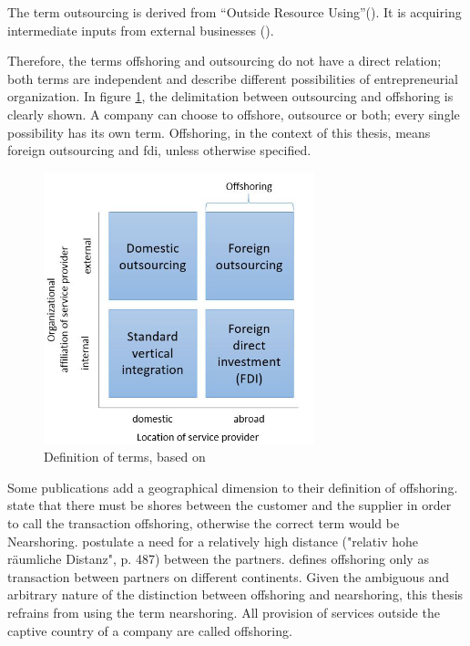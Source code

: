 The term outsourcing is derived from ``Outside Resource Using''(\cite[p. 46]{Specht.2007b}). It is acquiring intermediate inputs from external businesses (\cite[p. 46]{Specht.2007b}).

Therefore, the terms offshoring and outsourcing do not have a direct relation; both terms are independent and describe different possibilities of entrepreneurial organization. In figure \ref{fig:DefTerms}, the delimitation between outsourcing and offshoring is clearly shown. A company can choose to offshore, outsource or both; every single possibility has its own term. Offshoring, in the context of this thesis, means foreign outsourcing and \gls{fdi}, unless otherwise specified.

\begin{figure}[htb]
	\centering
	\includegraphics[width=0.7\textwidth]{Pictures/Terms_definition}
	\caption{Definition of terms, based on \cite[pp. 552f]{Antras.2004}}
	\label{fig:DefTerms}
\end{figure}

Some publications add a geographical dimension to their definition of offshoring. \cite{Jahns.2007} state that there must be shores between the customer and the supplier in order to call the transaction offshoring, otherwise the correct term would be Nearshoring. \cite{Cappallo.2006} postulate a need for a relatively high distance ("relativ hohe räumliche Distanz", p. 487) between the partners. \cite{Dressler.2007} defines offshoring only as transaction between partners on different continents. Given the ambiguous and arbitrary nature of the distinction between offshoring and nearshoring, this thesis refrains from using the term nearshoring. All provision of services outside the captive country of a company are called offshoring.

